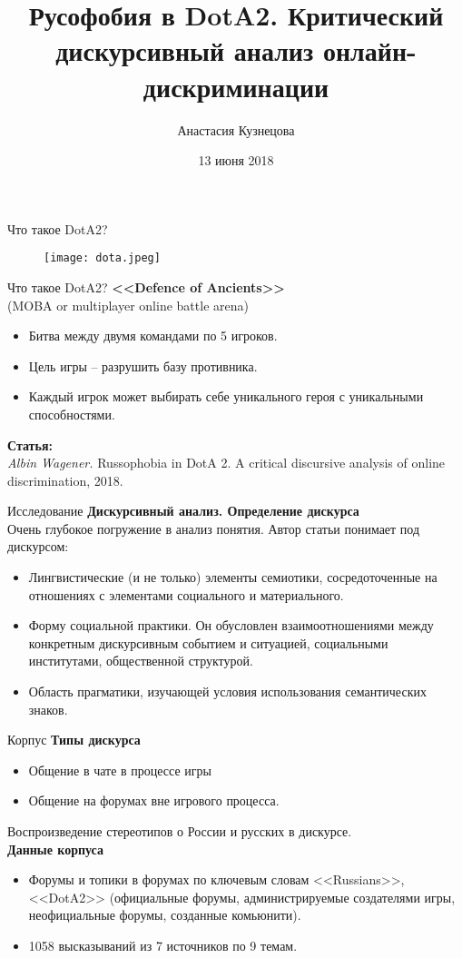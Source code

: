 \documentclass{beamer}
\title[Digital Humanities]{Русофобия в DotA2. Критический дискурсивный анализ онлайн-дискриминации}
\author{Анастасия Кузнецова}
\institute{НИУ ВШЭ}
\date{13 июня 2018}
\begin{document}
\begin{frame}
  \titlepage
\end{frame}


\begin{frame}{Что такое DotA2?}
		\begin{figure}
			\texttt{[image: dota.jpeg]}
		\end{figure}
\end{frame}
\begin{frame}{Что такое DotA2?}
	\textbf{<<Defence of Ancients>>} \\ (MOBA or multiplayer online battle arena)
	\begin{itemize}
		\item Битва между двумя командами по 5 игроков. 
		\item Цель игры -- разрушить базу противника. 
		\item Каждый игрок может выбирать себе уникального героя с уникальными способностями.
	\end{itemize}
	\textbf{Статья:} \\
	\textit{Albin Wagener.} Russophobia in DotA 2. A critical discursive analysis of online discrimination, 2018. 
\end{frame}

\begin{frame}{Исследование}
\textbf{Дискурсивный анализ. Определение дискурса} \\
Очень глубокое погружение в анализ понятия. Автор статьи понимает под дискурсом:
\begin{itemize}
	\item Лингвистические (и не только) элементы семиотики, сосредоточенные на отношениях с элементами социального и материального. 
	\item Форму социальной практики. Он обусловлен взаимоотношениями между конкретным дискурсивным событием и ситуацией, социальными институтами, общественной структурой. 
	\item Область прагматики, изучающей условия использования семантических знаков.
	
\end{itemize}

\end{frame}

\begin{frame}{Корпус}
	\textbf{Типы дискурса}
	\begin{itemize}
		\item Общение в чате в процессе игры
		\item Общение на форумах вне игрового процесса. 
	\end{itemize}
	Воспроизведение стереотипов о России и русских в дискурсе. \\
	\textbf{Данные корпуса}
		\begin{itemize}
			\item Форумы и топики в форумах по ключевым словам <<Russians>>, <<DotA2>> (официальные форумы, администрируемые создателями игры, неофициальные форумы, созданные комьюнити).
			\item 1058 высказываний из 7 источников по 9 темам. 
		\end{itemize}
\end{frame}
\end{document}
